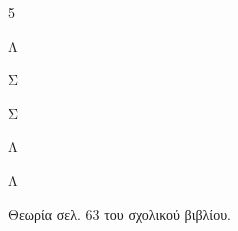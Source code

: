 
\begin{Alist}
\item
\begin{multicols}{5}
\begin{alist}
\item Λ
\item Σ
\item Σ
\item Λ
\item Λ
\end{alist}
\end{multicols}
\item Θεωρία σελ. 63 του σχολικού βιβλίου.
\end{Alist}


